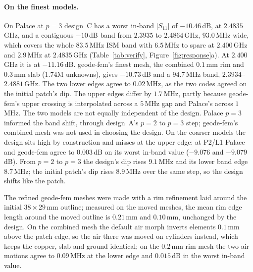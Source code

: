 \documentclass{anvil-paper}
\newcommand{\PL}{P2/L1}
\begin{document}
\paragraph{On the finest models.}
On Palace at $p = 3$ design~C has a worst in-band $|S_{11}|$ of
$-10.46$\,dB, at $2.4835$\,GHz, and a contiguous $-10$\,dB band from
$2.3935$ to $2.4864$\,GHz, $93.0$\,MHz wide, which covers the whole
$83.5$\,MHz ISM band with $6.5$\,MHz to spare at $2.400$\,GHz and $2.9$\,MHz
at $2.4835$\,GHz (Table~\ref{tab:verify}, Figure~\ref{fig:response}a). At
$2.400$\,GHz it is at $-11.16$\,dB. geode-fem's finest mesh, the combined
$0.1$\,mm rim and $0.3$\,mm slab ($1.74$M unknowns), gives $-10.73$\,dB and a
$94.7$\,MHz band, $2.3934$--$2.4881$\,GHz. The two lower edges agree to
$0.02$\,MHz, as the two codes agreed on the initial patch's dip. The upper
edges differ by $1.7$\,MHz, partly because geode-fem's upper crossing is
interpolated across a $5$\,MHz gap and Palace's across $1$\,MHz. The two
models are not equally independent of the design. Palace $p = 3$ informed
the band shift, through design~A's $p = 2$ to $p = 3$ step; geode-fem's
combined mesh was not used in choosing the design. On the coarser models the
design sits high by construction and misses at the upper edge: at \PL{}
Palace and geode-fem agree to $0.003$\,dB on its worst in-band value
($-9.076$ and $-9.079$\,dB). From $p = 2$ to $p = 3$ the design's dip rises
$9.1$\,MHz and its lower band edge $8.7$\,MHz; the initial patch's dip rises
$8.9$\,MHz over the same step, so the design shifts like the patch.

The refined geode-fem meshes were made with a rim refinement laid around
the initial $38\times29$\,mm outline; measured on the moved meshes, the mean
rim edge length around the moved outline is $0.21$\,mm and $0.10$\,mm,
unchanged by the design. On the combined mesh the default air morph
inverts elements $0.1$\,mm above the patch edge, so the air there was moved
on cylinders instead, which keeps the copper, slab and ground identical; on
the $0.2$\,mm-rim mesh the two air motions agree to $0.09$\,MHz at the lower
edge and $0.015$\,dB in the worst in-band value.
\end{document}
